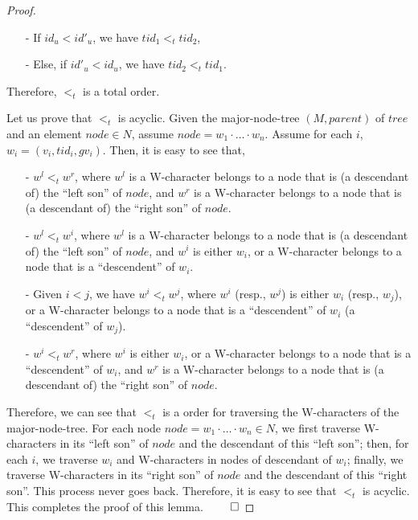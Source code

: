 \begin {proof}
\begin{itemize}
\begin{itemize}
        \begin{itemize}
        \setlength{\itemsep}{0.5pt}
        \item[-] If $id_u < id'_u$, we have $tid_1 <_t tid_2$,
        \item[-] Else, if $id'_u < id_u$, we have $tid_2 <_t tid_1$.
        \end{itemize}
    \end{itemize}
\end{itemize}

Therefore, $<_t$ is a total order.

Let us prove that $<_t$ is acyclic. Given the major-node-tree $(M,parent)$ of $tree$ and an element $node \in N$, assume $node = w_1 \cdot \ldots \cdot w_n$. Assume for each $i$, $w_i = (v_i,tid_i,gv_i)$. Then, it is easy to see that,

\begin{itemize}
\setlength{\itemsep}{0.5pt}
\item[-] $w^l <_t w^r$, where $w^l$ is a W-character belongs to a node that is (a descendant of) the ``left son'' of $node$, and $w^r$ is a W-character belongs to a node that is (a descendant of) the ``right son'' of $node$.

\item[-] $w^l <_t w^i$, where $w^l$ is a W-character belongs to a node that is (a descendant of) the ``left son'' of $node$, and $w^i$ is either $w_i$, or a W-character belongs to a node that is a ``descendent'' of $w_i$.

\item[-] Given $i<j$, we have $w^i <_t w^j$, where $w^i$ (resp., $w^j$) is either $w_i$ (resp., $w_j$), or a W-character belongs to a node that is a ``descendent'' of $w_i$ (a ``descendent'' of $w_j$).

\item[-] $w^i <_t w^r$, where $w^i$ is either $w_i$, or a W-character belongs to a node that is a ``descendent'' of $w_i$, and $w^r$ is a W-character belongs to a node that is (a descendant of) the ``right son'' of $node$.
\end{itemize}

Therefore, we can see that $<_t$ is a order for traversing the W-characters of the major-node-tree. For each node $node = w_1 \cdot \ldots \cdot w_n \in N$, we first traverse W-characters in its ``left son'' of $node$ and the descendant of this ``left son''; then, for each $i$, we traverse $w_i$ and W-characters in nodes of descendant of $w_i$; finally, we traverse W-characters in its ``right son'' of $node$ and the descendant of this ``right son''. This process never goes back. Therefore, it is easy to see that $<_t$ is acyclic. This completes the proof of this lemma. $\qed$
\end {proof}


